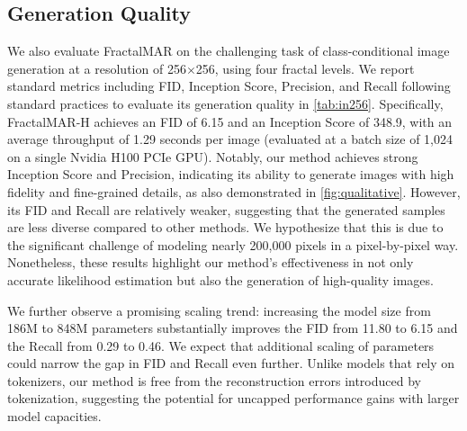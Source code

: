 \documentclass{article}
\begin{document}
\subsection{Generation Quality} 
We also evaluate FractalMAR on the challenging task of class-conditional image generation at a resolution of 256$\times$256, using four fractal levels.
We report standard metrics including FID, Inception Score, Precision, and Recall following standard practices to evaluate its generation quality in \autoref{tab:in256}. Specifically, FractalMAR-H achieves an FID of 6.15 and an Inception Score of 348.9, with an average throughput of 1.29 seconds per image (evaluated at a batch size of 1,024 on a single Nvidia H100 PCIe GPU). Notably, our method achieves  strong Inception Score and Precision, indicating its ability to generate images with high fidelity and fine-grained details, as also demonstrated in \autoref{fig:qualitative}. However, its FID and Recall are relatively weaker, suggesting that the generated samples are less diverse compared to other methods. We hypothesize that this is due to the significant challenge of modeling nearly 200,000 pixels in a pixel-by-pixel way. Nonetheless, these results highlight our method's effectiveness in not only accurate likelihood estimation but also the generation of high-quality images.

We further observe a promising scaling trend: increasing the model size from 186M to 848M parameters substantially improves the FID from 11.80 to 6.15 and the Recall from 0.29 to 0.46. We expect that additional scaling of parameters could narrow the gap in FID and Recall even further. Unlike models that rely on tokenizers, our method is free from the reconstruction errors introduced by tokenization, suggesting the potential for uncapped performance gains with larger model capacities.
\end{document}
